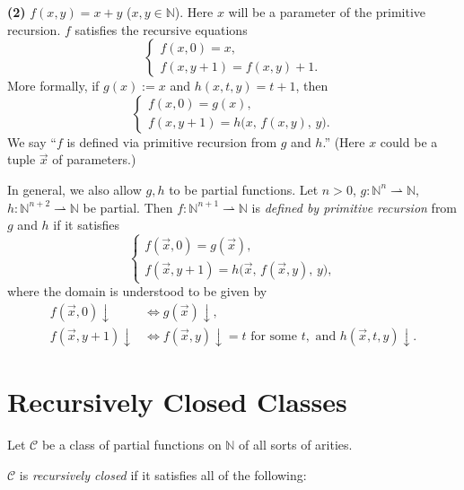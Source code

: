 \documentclass[11pt]{article}
\begin{document}
\textbf{(2)} $f(x, y) = x + y$ ($x, y \in \mathbb{N}$). Here $x$ will be a parameter of the primitive recursion. $f$ satisfies the recursive equations
\[
    \begin{cases} f(x, 0) = x, \\ f(x, y+1) = f(x, y) + 1. \end{cases}
\]
More formally, if $g(x) := x$ and $h(x, t, y) = t + 1$, then
\[
    \begin{cases} f(x, 0) = g(x), \\ f(x, y+1) = h\bigl(x,\, f(x, y),\, y\bigr). \end{cases}
\]
We say ``$f$ is defined via primitive recursion from $g$ and $h$.'' (Here $x$ could be a tuple $\vec{x}$ of parameters.)

In general, we also allow $g, h$ to be partial functions. Let $n > 0$, $g\colon \mathbb{N}^n \rightharpoonup \mathbb{N}$, $h\colon \mathbb{N}^{n+2} \rightharpoonup \mathbb{N}$ be partial. Then $f\colon \mathbb{N}^{n+1} \rightharpoonup \mathbb{N}$ is \emph{defined by primitive recursion} from $g$ and $h$ if it satisfies
\[
    \begin{cases} f(\vec{x}, 0) = g(\vec{x}), \\ f(\vec{x}, y+1) = h\bigl(\vec{x},\, f(\vec{x}, y),\, y\bigr), \end{cases}
\]
where the domain is understood to be given by
\begin{align*}
    f(\vec{x}, 0){\downarrow} &\iff g(\vec{x}){\downarrow}, \\
    f(\vec{x}, y+1){\downarrow} &\iff f(\vec{x}, y){\downarrow}= t \text{ for some } t, \text{ and } h(\vec{x}, t, y){\downarrow}.
\end{align*}

\section{Recursively Closed Classes}

Let $\mathcal{C}$ be a class of partial functions on $\mathbb{N}$ of all sorts of arities.

$\mathcal{C}$ is \emph{recursively closed} if it satisfies all of the following:
\end{document}
